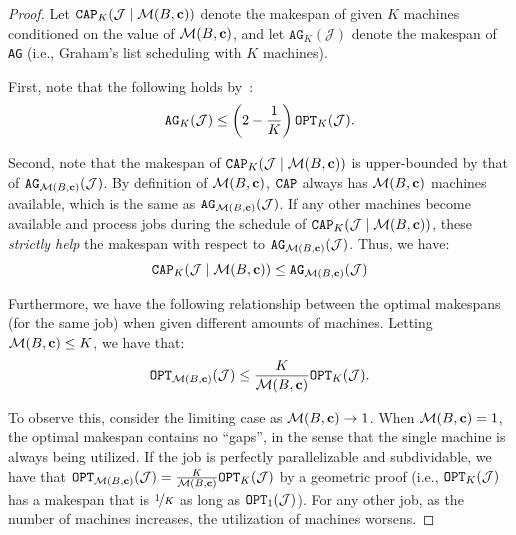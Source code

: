 \begin{proof}
Let $\texttt{CAP}_K(\mathcal{J} \mid \mathcal{M}(B, {\mathbf{c}}) )$ denote the makespan of \CAP given $K$ machines conditioned on the value of $\mathcal{M}(B, {\mathbf{c}})$, and let $\texttt{AG}_K(\mathcal{J})$ denote the makespan of \texttt{AG} (i.e., Graham's list scheduling with $K$ machines).

First, note that the following holds by~\cite{Graham:66}:
\[
\texttt{AG}_K(\mathcal{J}) \le \left(2 - \frac{1}{K}\right) \texttt{OPT}_K(\mathcal{J}).
\]

Second, note that the makespan of $\texttt{CAP}_K(\mathcal{J} \mid \mathcal{M}(B, {\mathbf{c}}) )$ is upper-bounded by that of $\texttt{AG}_{\mathcal{M}(B, {\mathbf{c}})}(\mathcal{J}) $.  By definition of $\mathcal{M}(B, {\mathbf{c}})$, $\texttt{CAP}$ always has $\mathcal{M}(B, {\mathbf{c}})$ machines available, which is the same as $\texttt{AG}_{\mathcal{M}(B, {\mathbf{c}})}(\mathcal{J})$.  If any other machines become available and process jobs during the schedule of $\texttt{CAP}_K(\mathcal{J} \mid \mathcal{M}(B, {\mathbf{c}}) )$, these \textit{strictly help} the makespan with respect to $\texttt{AG}_{\mathcal{M}(B, {\mathbf{c}})}(\mathcal{J})$.  Thus, we have:
\[
\texttt{CAP}_K(\mathcal{J} \mid \mathcal{M}(B, {\mathbf{c}}) ) \le \texttt{AG}_{\mathcal{M}(B, {\mathbf{c}})}(\mathcal{J})
\]

Furthermore, we have the following relationship between the optimal makespans (for the same job) when given different amounts of machines.  Letting $\mathcal{M}(B, {\mathbf{c}}) \le K$, we have that:
\[
\texttt{OPT}_{\mathcal{M}(B, {\mathbf{c}})}(\mathcal{J}) \le \frac{K}{\mathcal{M}(B, {\mathbf{c}})} \texttt{OPT}_K(\mathcal{J}).
\]

To observe this, consider the limiting case as $\mathcal{M}(B, {\mathbf{c}}) \to 1$.     When $\mathcal{M}(B, {\mathbf{c}}) = 1$, the optimal makespan contains no ``gaps'', in the sense that the single machine is always being utilized.  If the job is perfectly parallelizable and subdividable, we have that $\texttt{OPT}_{\mathcal{M}(B, {\mathbf{c}})}(\mathcal{J}) = \frac{K}{\mathcal{M}(B, {\mathbf{c}})} \texttt{OPT}_K(\mathcal{J})$ by a geometric proof (i.e., $\texttt{OPT}_K(\mathcal{J})$ has a makespan that is $\nicefrac{1}{K}$ as long as $\texttt{OPT}_1(\mathcal{J})$).  For any other job, as the number of machines increases, the utilization of machines worsens.  


\end{proof}

